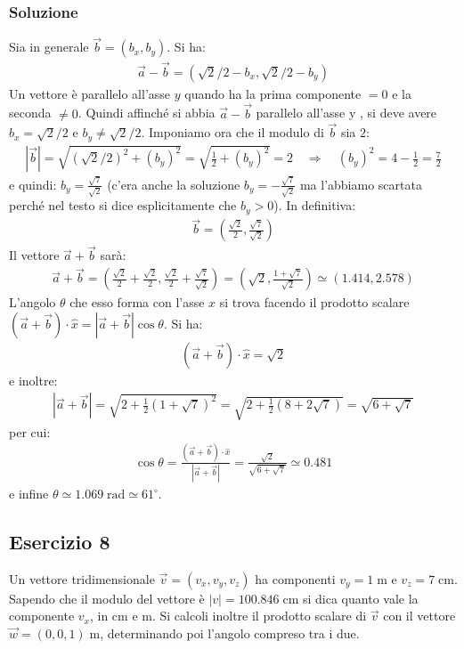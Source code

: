 \documentclass[12pt,a4paper]{book}
\begin{document}
\subsubsection*{Soluzione}
Sia in generale $\vec{b}=(b_x, b_y)$. Si ha:
\begin{gather*}
\vec{a}-\vec{b}=(\sqrt{2}/2-b_x, \sqrt{2}/2-b_y)
\end{gather*}
Un vettore è parallelo all'asse $y$ quando ha la prima componente $=0$ e la seconda $\neq 0$. Quindi affinché si abbia $\vec{a}-\vec{b}$ parallelo all'asse y  , si deve avere $b_x=\sqrt{2}/2$ e $b_y \neq \sqrt{2}/2$. Imponiamo ora che il modulo di $\vec{b}$ sia $2$:
\begin{gather*}
|\vec{b}|=\sqrt{(\sqrt{2}/2)^2 + (b_y)^2}=\sqrt{\frac{1}{2} + (b_y)^2}=2  \quad \Rightarrow \quad (b_y)^2=4-\frac{1}{2}=\frac{7}{2}
\end{gather*}
e quindi: $b_y=\frac{\sqrt{7}}{\sqrt{2}}$ (c'era anche la soluzione  $b_y=-\frac{\sqrt{7}}{\sqrt{2}}$ ma l'abbiamo scartata perché nel testo si dice esplicitamente che $b_y>0$).
In definitiva:
\begin{gather*}
\vec{b}=(\frac{\sqrt{2}}{2}, \frac{\sqrt{7}}{\sqrt{2}})
\end{gather*}
Il vettore $\vec{a}+\vec{b}$ sarà:
\begin{gather*}
\vec{a}+\vec{b}=(\frac{\sqrt{2}}{2}+\frac{\sqrt{2}}{2}, \frac{\sqrt{2}}{2}+\frac{\sqrt{7}}{\sqrt{2}})= (\sqrt{2}, \frac{1+\sqrt{7}}{\sqrt{2}}) \simeq (1.414, 2.578)
\end{gather*}
L'angolo $\theta$ che esso forma con l'asse $x$ si trova facendo il prodotto scalare $(\vec{a}+\vec{b})\cdot \hat{x}=|\vec{a}+\vec{b}|\cos \theta$. Si ha: 
\begin{gather*}
(\vec{a}+\vec{b})\cdot \hat{x}=\sqrt{2}
\end{gather*}
e inoltre:
\begin{gather*}
|\vec{a}+\vec{b}|=\sqrt{2+\frac{1}{2}(1+\sqrt{7})^2}=\sqrt{2+\frac{1}{2}(8+2\sqrt{7})}=\sqrt{6+\sqrt{7}}
\end{gather*}
per cui:
\begin{gather*}
\cos \theta=\frac{(\vec{a}+\vec{b})\cdot \hat{x}}{|\vec{a}+\vec{b}|}=\frac{\sqrt{2}}{\sqrt{6+\sqrt{7}}} \simeq 0.481
\end{gather*}
e infine $\theta\simeq 1.069 \; \text{rad} \simeq 61^{\circ}$.


\subsection*{Esercizio 8}
Un vettore tridimensionale $\vec{v}=(v_x, v_y, v_z)$ ha componenti $v_y= 1\;$m e $v_z=7\;$cm. Sapendo che il modulo del vettore è $|v|=100.846\;$cm si dica quanto vale la componente $v_x$, in cm e m. Si calcoli inoltre il prodotto scalare di $\vec{v}$ con il vettore $\vec{w}=(0,0,1)\;$m, determinando poi l'angolo compreso tra i due.
\end{document}
